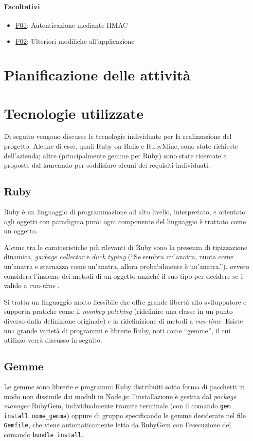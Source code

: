 \paragraph{Facoltativi}
\begin{itemize}
    \item \underline{F01}: Autenticazione mediante HMAC
    \item \underline{F02}: Ulteriori modifiche all’applicazione
\end{itemize}

\section{Pianificazione delle attività}


\section{Tecnologie utilizzate}
Di seguito vengono discusse le tecnologie individuate per la realizzazione del progetto. Alcune di esse, quali Ruby on Rails e RubyMine, sono state richieste dell'azienda; altre (principalmente gemme per Ruby) sono state ricercate e proposte dal laureando per soddisfare alcuni dei requisiti individuati.

\subsection{Ruby}
Ruby è un linguaggio di programmazione ad alto livello, interpretato, e orientato agli oggetti con paradigma puro: ogni componente del linguaggio è trattato come un oggetto. 

Alcune tra le caratteristiche più rilevanti di Ruby sono la presenza di tipizzazione dinamica, \textit{garbage collector} e \textit{duck typing} (``Se sembra un'anatra, nuota come un'anatra e starnazza come un'anatra, allora probabilmente è un'anatra.''), ovvero considera l'insieme dei metodi di un oggetto anziché il suo tipo per decidere se è valido a \textit{run-time} .

Si tratta un linguaggio molto flessibile che offre grande libertà allo sviluppatore e supporta pratiche come il \textit{monkey patching} (ridefinire una classe in un punto diverso dalla definizione originale) e la ridefinizione di metodi a \textit{run-time}.
Esiste una grande varietà di programmi e librerie Ruby, noti come ``gemme'', il cui utilizzo verrà discusso in seguito.

\subsection{Gemme}
Le gemme sono librerie e programmi Ruby distribuiti sotto forma di pacchetti in modo non dissimile dai moduli in Node.js: l'installazione è gestita dal \textit{package manager} RubyGem, individualmente tramite terminale (con il comando \texttt{gem install nome\_gemma}) oppure di gruppo specificando le gemme desiderate nel file \texttt{Gemfile}, che viene automaticamente letto da RubyGem con l'esecuzione del comando \texttt{bundle install}.

